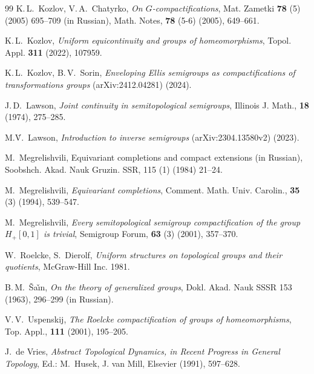\documentclass{amsart}
\begin{document}
\begin{thebibliography}{99}
  K.\,L.~Kozlov, V.\,A.~Chatyrko, {\it On $G$-compactifications}, Mat. Zametki {\bf 78} (5) (2005) 695--709 (in Russian), Math. Notes, {\bf 78}  (5-6) (2005), 649--661.

 K.\,L.~Kozlov, {\it Uniform equicontinuity and groups of homeomorphisms}, Topol. Appl.  {\bf 311} (2022), 107959.

 K.\,L.~Kozlov, B.\,V.~Sorin, {\it Enveloping Ellis semigroups as compactifications of transformations groups} (arXiv:2412.04281) (2024).

 J.\,D.~Lawson, {\it Joint continuity in semitopological semigroups}, Illinois J. Math., {\bf 18}  (1974), 275--285.

 M.\. V.~Lawson, {\it Introduction to inverse semigroups} (arXiv:2304.13580v2) (2023).

 M.~Megrelishvili, Equivariant completions and compact extensions (in Russian), Soobshch. Akad. Nauk Gruzin. SSR, 115 (1)  (1984) 21--24.

 M.~Megrelishvili, {\it Equivariant completions}, Comment. Math. Univ. Carolin., {\bf 35} (3) (1994), 539--547.

 M.~Megrelishvili, {\it Every semitopological semigroup compactification of the group $H_+[0, 1]$ is trivial}, Semigroup Forum,  {\bf 63} (3) (2001), 357--370.

 W.~Roelcke, S.~Dierolf, {\it Uniform structures on topological groups and their quotients}, McGraw-Hill Inc. 1981.

 B.\,M.~\v Sa\v\i n, {\it On the theory of generalized groups}, Dokl. Akad. Nauk SSSR 153 (1963), 296--299 (in Russian).

 V.\,V.~Uspenskij, {\it The Roelcke compactification of groups of homeomorphisms}, Top. Appl., {\bf 111} (2001), 195--205.

  J.~de Vries, {\it Abstract Topological Dynamics, in Recent Progress in General Topology}, Ed.: M.~Husek, J. van Mill,  Elsevier (1991), 597--628.

\end{thebibliography}
\end{document}
